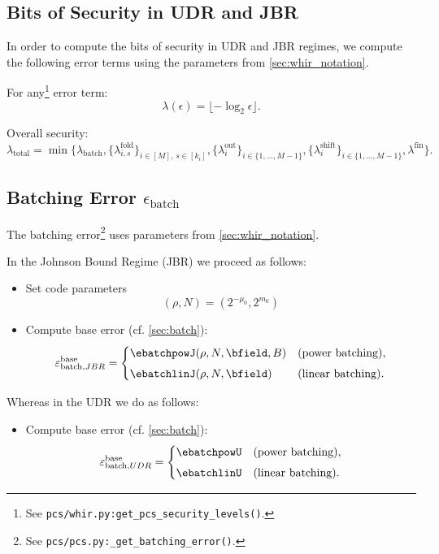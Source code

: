 \subsection{Bits of Security in UDR and JBR}

In order to compute the bits of security in UDR and JBR regimes, we compute the following error terms using the parameters from \cref{sec:whir_notation}.

For any\footnote{See \texttt{pcs/whir.py:get\_pcs\_security\_levels()}.} error term:
\[
  \lambda(\epsilon)
  = \lfloor-\log_2\epsilon\rfloor.
\]

Overall security:
\[
  \lambda_{\mathrm{total}}
    = \min\{
      \lambda_{\mathrm{batch}},
      \{\lambda^{\mathrm{fold}}_{i,s}\}_{i\in [M],\,s\in[k_i]},
      \{\lambda^{\mathrm{out}}_i\}_{i\in \{1,\ldots,M-1\}},
      \{\lambda^{\mathrm{shift}}_i\}_{i\in \{1,\ldots,M-1\}},
      \lambda^{\mathrm{fin}}
    \}.
\]

\subsection{Batching Error \(\epsilon_{\mathrm{batch}}\)}

The batching error\footnote{See \texttt{pcs/pcs.py:\_get\_batching\_error()}.} uses parameters from \cref{sec:whir_notation}.

In the Johnson Bound Regime (JBR) we proceed as follows:
\begin{itemize}
    \item Set code parameters $$
    (\rho,N)= \left(2^{-\mu_0}, 2^{m_0}\right)
    $$
    \item Compute base error (cf. \cref{sec:batch}):
\[
\varepsilon_{\mathrm{batch}, JBR}^{\text{base}} =
\begin{cases}
   \ebatchpowJ(\rho,N,\bfield,B) & \text{(power batching)}, \\[4pt]
  \ebatchlinJ(\rho,N,\bfield)& \text{(linear batching)}.
\end{cases}
\]
\end{itemize}
Whereas in the UDR we do as follows:
\begin{itemize}
    \item Compute base error (cf. \cref{sec:batch}):
\[
\varepsilon_{\mathrm{batch}, UDR}^{\text{base}} =
\begin{cases}
   \ebatchpowU & \text{(power batching)}, \\[4pt]
  \ebatchlinU& \text{(linear batching)}.
\end{cases}
\]
\end{itemize}

